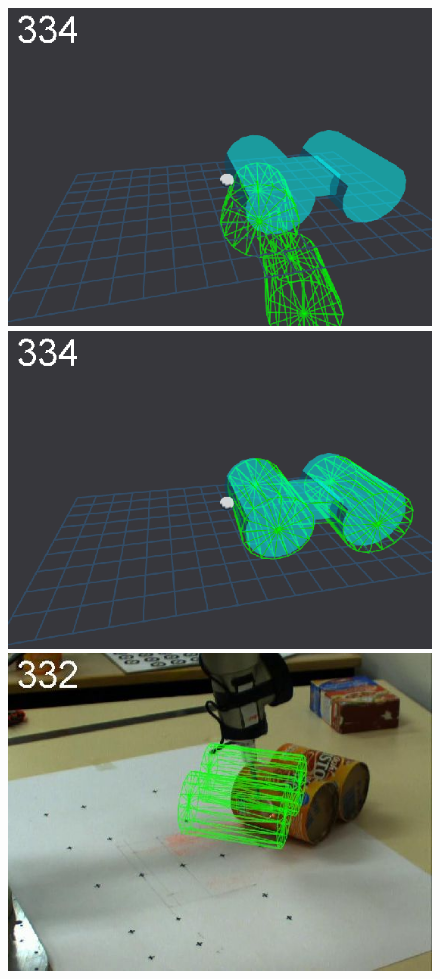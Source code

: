 \begin{figure}[tbp]
{\includegraphics[width=\imgCXwid]{images/C5_2exp_6_5}
\includegraphics[width=\imgCXwid]{images/C5_3exp_6_5}
\includegraphics[width=\imgCXwid]{images/C2_3exp_75_5}
}


\end{figure}
